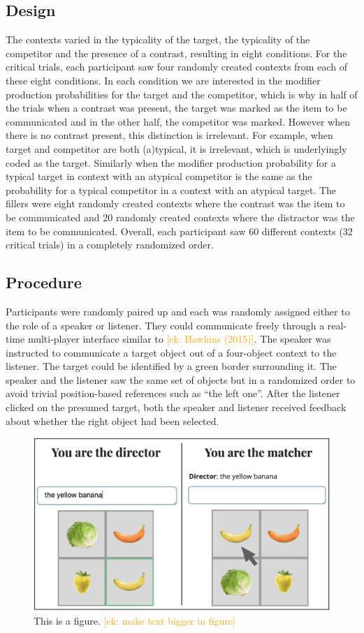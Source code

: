 \documentclass[10pt,letterpaper]{article}
\newcommand{\ek}[1]{\textcolor{Orange}{[ek: #1]}}
\begin{document}
\subsection{Design}
The contexts varied in the typicality of the target, the typicality of the competitor and the presence of a contrast, resulting in eight conditions. For the critical trials, each participant saw four randomly created contexts from each of these eight conditions. In each condition we are interested in the modifier production probabilities for the target and the competitor, which is why in half of the trials when a contrast was present, the target was marked as the item to be communicated and in the other half, the competitor was marked. However when there is no contrast present, this distinction is irrelevant. For example, when target and competitor are both (a)typical, it is irrelevant, which is underlyingly coded as the target. Similarly when the modifier production probability for a typical target in context with an atypical competitor is the same as the probability for a typical competitor in a context with an atypical target. 
The fillers were eight randomly created contexts where the contrast was the item to be communicated and 20 randomly created contexts where the distractor was the item to be communicated.
Overall, each participant saw 60 different contexts (32 critical trials) in a completely randomized order.


\subsection{Procedure}
Participants were randomly paired up and each was randomly assigned either to the role of a speaker or listener. They could communicate freely through a real-time multi-player interface similar to \ek{Hawkins (2015)}. The speaker was instructed to communicate a target object out of a four-object context to the listener. The target could be identified by a green border surrounding it. The speaker and the listener saw the same set of objects but in a randomized order to avoid trivial position-based references such as “the left one”. After the listener clicked on the presumed target, both the speaker and listener received feedback about whether the right object had been selected.

\begin{figure}[H]
	\begin{center}
		\includegraphics[width=.475\textwidth]{graphs/prod-design.pdf}
	\end{center}
\caption{This is a figure. \ek{make text bigger in figure}} 
\label{prod-results}
\end{figure}
\end{document}
